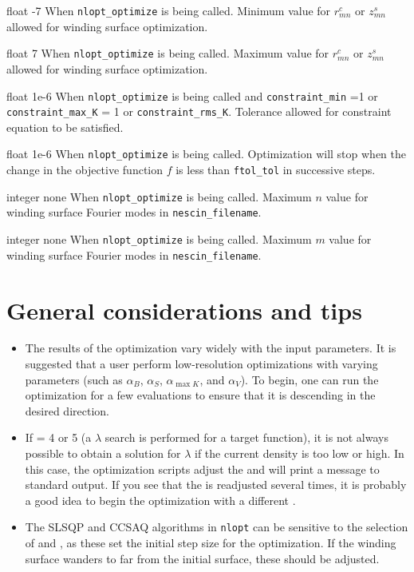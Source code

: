 \myhrule

{float}
{-7}
{When \texttt{nlopt\_optimize} is being called. }
{Minimum value for $r_{mn}^c$ or $z_{mn}^s$ allowed for winding surface optimization.}

\myhrule

{float}
{7}
{When \texttt{nlopt\_optimize} is being called. }
{Maximum value for $r_{mn}^c$ or $z_{mn}^s$ allowed for winding surface optimization.}

\myhrule

{float}
{1e-6}
{When \texttt{nlopt\_optimize} is being called and \texttt{constraint\_min} =1 or \texttt{constraint\_max\_K} = 1 or \texttt{constraint\_rms\_K}.}
{Tolerance allowed for constraint equation to be satisfied.}

\myhrule

{float}
{1e-6}
{When \texttt{nlopt\_optimize} is being called.}
{Optimization will stop when the change in the objective function $f$ is less than \texttt{ftol\_tol} in successive steps.}

\myhrule

{integer}
{none}
{When \texttt{nlopt\_optimize} is being called.}
{Maximum $n$ value for winding surface Fourier modes in \texttt{nescin\_filename}.}

\myhrule

{integer}
{none}
{When \texttt{nlopt\_optimize} is being called.}
{Maximum $m$ value for winding surface Fourier modes in \texttt{nescin\_filename}.}

\section{General considerations and tips}
\begin{itemize}
\item The results of the optimization vary widely with the input parameters. It is suggested that a user perform low-resolution optimizations with varying parameters (such as $\alpha_B$, $\alpha_S$, $\alpha_{\max{K}}$, and $\alpha_V$). To begin, one can run the optimization for a few evaluations to ensure that it is descending in the desired direction. 
\item If  = 4 or 5 (a $\lambda$ search is performed for a target function), it is not always possible to obtain a solution for $\lambda$ if the current density is too low or high. In this case, the optimization scripts adjust the  and will print a message to standard output. If you see that the  is readjusted several times, it is probably a good idea to begin the optimization with a different  . 
\item The SLSQP and CCSAQ algorithms in \texttt{nlopt} can be sensitive to the selection of  and , as these set the initial step size for the optimization. If the winding surface wanders to far from the initial surface, these should be adjusted. 
\end{itemize}
